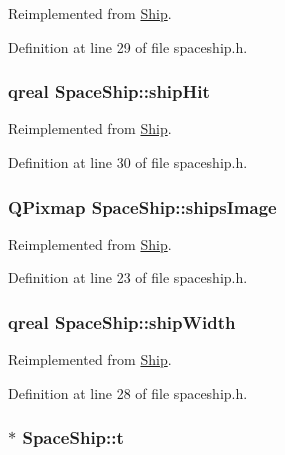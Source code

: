 Reimplemented from \hyperlink{class_ship_a16205aae21b89c3fb57960a70be931a2}{Ship}.

Definition at line 29 of file spaceship.h.\hypertarget{class_space_ship_a53bc0fb5aa0a9b0c0d7fc70a76e1feda}{
\subsubsection[{shipHit}]{\setlength{\rightskip}{0pt plus 5cm}qreal {\bf SpaceShip::shipHit}}}
\label{class_space_ship_a53bc0fb5aa0a9b0c0d7fc70a76e1feda}


Reimplemented from \hyperlink{class_ship_a1fd726a67e6b11d5ce19f4657db40237}{Ship}.

Definition at line 30 of file spaceship.h.\hypertarget{class_space_ship_a5bdb581da7eafb13095e97666ebe83bc}{
\subsubsection[{shipsImage}]{\setlength{\rightskip}{0pt plus 5cm}QPixmap {\bf SpaceShip::shipsImage}}}
\label{class_space_ship_a5bdb581da7eafb13095e97666ebe83bc}


Reimplemented from \hyperlink{class_ship_a3e61137191ddd959a57e0cd8928b4873}{Ship}.

Definition at line 23 of file spaceship.h.\hypertarget{class_space_ship_a842854c644480d337e52fa125a838cce}{
\subsubsection[{shipWidth}]{\setlength{\rightskip}{0pt plus 5cm}qreal {\bf SpaceShip::shipWidth}}}
\label{class_space_ship_a842854c644480d337e52fa125a838cce}


Reimplemented from \hyperlink{class_ship_ae57e882cf6611414d239b241f6711ba6}{Ship}.

Definition at line 28 of file spaceship.h.\hypertarget{class_space_ship_aa415fbdaccd76864a11592e738cf0348}{
\subsubsection[{t}]{$\ast$ {\bf SpaceShip::t}}}
\label{class_space_ship_aa415fbdaccd76864a11592e738cf0348}


